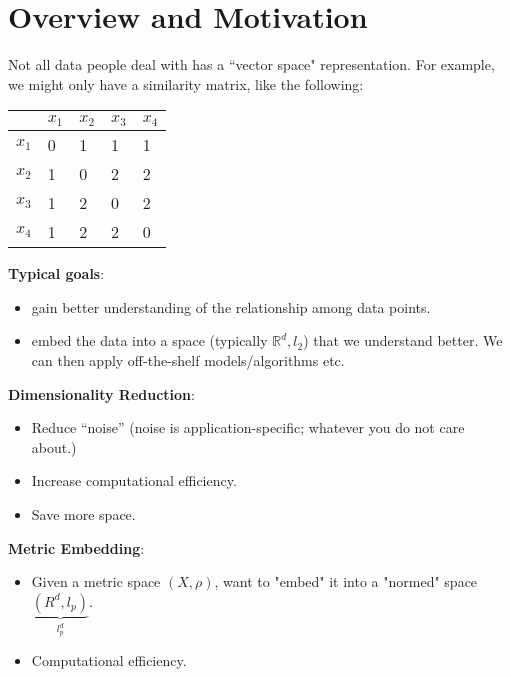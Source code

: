 \section{Overview and Motivation}
Not all data people deal with has a ``vector space"
representation. For example, we might only have a similarity matrix,
like the following: 
\begin{center}
  \begin{tabular}{ | l | l | l | l | l |}
    \hline
    & $x_1$ & $x_2$ & $x_3$ & $x_4$\\
    \hline
    $x_1$ & 0 & 1 & 1 & 1 \\ \hline
    $x_2$ & 1 & 0 & 2 & 2 \\ \hline
    $x_3$ & 1 & 2 & 0 & 2 \\ \hline
    $x_4$ & 1 & 2 & 2 & 0 \\ \hline
    \hline
  \end{tabular}
\end{center}

\textbf{Typical goals}:
\begin{itemize}
\item gain better understanding of the relationship among data points.
\item embed the data into a space (typically $\mathbb{R}^d,l_2$) that
  we understand better. We can then apply off-the-shelf
  models/algorithms etc. 
\end{itemize}

\textbf{Dimensionality Reduction}:
\begin{itemize}
\item Reduce ``noise'' (noise is application-specific; whatever you do
  not care about.) 
\item Increase computational efficiency.
\item Save more space.
\end{itemize}

\textbf{Metric Embedding}:
\begin{itemize}
\item Given a metric space $(X,\rho)$, want to "embed" it into a
  "normed" space $\underbrace{(R^d,l_p)}_{l^d_p}$. 
\item Computational efficiency.
\end{itemize}

